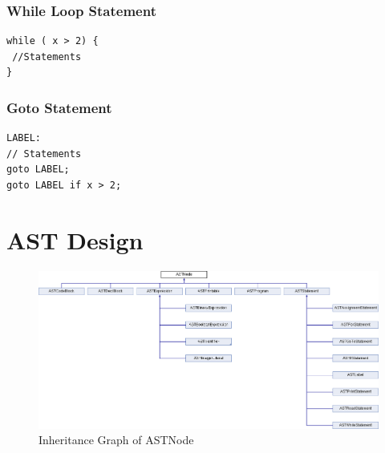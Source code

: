 \documentclass[12pt]{report}
\begin{document}
\subsubsection*{While Loop Statement}
\begin{lstlisting}
while ( x > 2) {
 //Statements
}
\end{lstlisting}

\subsubsection*{Goto Statement}
\begin{lstlisting}
LABEL:
// Statements
goto LABEL;
goto LABEL if x > 2;
\end{lstlisting}

\newpage
\section*{AST Design}
\begin{figure}[h]
  \includegraphics[width=\linewidth]{class_a_s_t_node.png}
  \caption{Inheritance Graph of ASTNode}
  \label{fig:figure1}
\end{figure}
\end{document}

